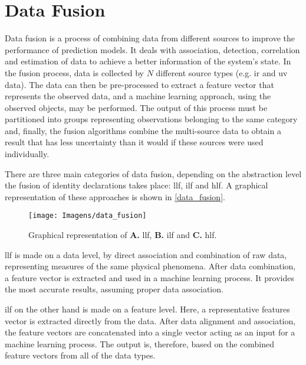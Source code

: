 
\section{Data Fusion} \label{data_fus}


Data fusion is a process of combining data from different sources to improve the performance of prediction models. It deals with association, detection, correlation and estimation of data to achieve a better information of the system's state. In the fusion process, data is collected by $ N $ different source types (e.g. \gls{ir} and \gls{uv} data). The data can then be pre-processed to extract a feature vector that represents the observed data, and a machine learning approach, using the observed objects, may be performed. The output of this process must be partitioned into groups representing observations belonging to the same category and, finally, the fusion algorithms combine the multi-source data to obtain a result that has less uncertainty than it would if these sources were used individually. 

There are three main categories of data fusion, depending on the abstraction level the fusion of identity declarations takes place: \gls{llf}, \gls{ilf} and \gls{hlf}. A graphical representation of these approaches is shown in \autoref{data_fusion}.


\begin{figure}[!htb]
	\centering
	\texttt{[image: Imagens/data\_fusion]}
	\caption{Graphical representation of \textbf{A.} \acrfull{llf}, \textbf{B.} \acrfull{ilf} and \textbf{C.} \acrfull{hlf}.}
	\label{data_fusion}
\end{figure}


\gls{llf} is made on a data level, by direct association and combination of raw data, representing measures of the same physical phenomena. After data combination, a feature vector is extracted and used in a machine learning process. It provides the most accurate results, assuming proper data association.

\gls{ilf} on the other hand is made on a feature level. Here, a representative features vector is extracted directly from the data. After data alignment and association, the feature vectors are concatenated into a single vector acting as an input for a machine learning process. The output is, therefore, based on the combined feature vectors from all of the data types.

